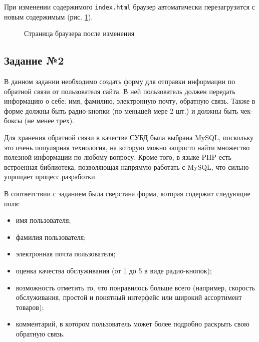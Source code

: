 \documentclass[a4paper, 14pt]{extarticle}
\begin{document}
При изменении содержимого \texttt{index.html} браузер автоматически
перезагрузится с новым содержимым (рис. \ref{fig:browser-after}).

\begin{figure}[H]
  \centering
  \caption{Страница браузера после изменения}
  \label{fig:browser-after}
\end{figure}

\subsection*{Задание №2}

В данном задании необходимо создать форму для отправки информации по обратной
связи от пользователя сайта. В ней пользователь должен передать информацию о
себе: имя, фамилию, электронную почту, обратную связь. Также в форме должны быть
радио-кнопки (по меньшей мере 2 шт.) и должны быть чек-боксы (не менее трех).

Для хранения обратной связи в качестве СУБД была выбрана MySQL, поскольку это
очень популярная технология, на которую можно запросто найти множество полезной
информации по любому вопросу. Кроме того, в языке PHP есть встроенная
библиотека, позволяющая напрямую работать с MySQL, что сильно упрощает процесс
разработки.

В соответствии с заданием была сверстана форма, которая содержит следующие поля:
\begin{itemize}
  \item имя пользователя;
  \item фамилия пользователя;
  \item электронная почта пользователя;
  \item оценка качества обслуживания (от 1 до 5 в виде радио-кнопок);
  \item возможность отметить то, что понравилось больше всего (например,
  скорость обслуживания, простой и понятный интерфейс или широкий ассортимент
  товаров);
  \item комментарий, в котором пользователь может более подробно раскрыть свою
  обратную связь.
\end{itemize}
\end{document}
